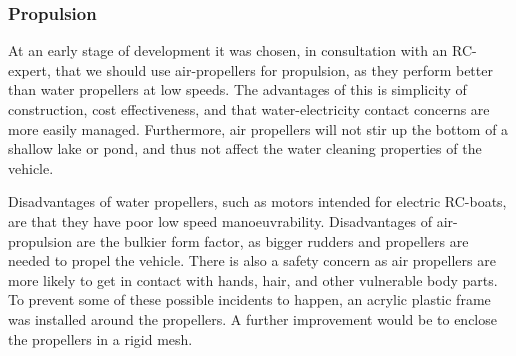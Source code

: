 

\subsubsection{Propulsion}

At an early stage of development it was chosen, in consultation with an RC-expert, that we should use air-propellers for propulsion, as they perform better than water propellers at low speeds. The advantages of this is simplicity of construction, cost effectiveness, and that water-electricity contact concerns are more easily managed. Furthermore, air propellers will not stir up the bottom of a shallow lake or pond, and thus not affect the water cleaning properties of the vehicle.

Disadvantages of water propellers, such as motors intended for electric RC-boats, are that they have poor low speed manoeuvrability. Disadvantages of air-propulsion are the bulkier form factor, as bigger rudders and propellers are needed to propel the vehicle. There is also a safety concern as air propellers are more likely to get in contact with hands, hair, and other vulnerable body parts. To prevent some of these possible incidents to happen, an acrylic plastic frame was installed around the propellers. A further improvement would be to enclose the propellers in a rigid mesh.


